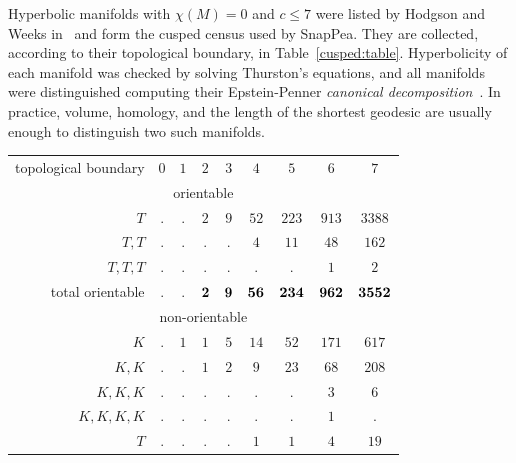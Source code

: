 \documentclass[10pt]{article}      %
\begin{document}
Hyperbolic manifolds with $\chi(M)=0$ and $c\leqslant 7$ were listed 
by Hodgson and Weeks in~\cite{CaHiWe}
and form the cusped census used by SnapPea. They are collected, according to their
topological boundary, in Table~\ref{cusped:table}.
Hyperbolicity of each manifold was checked by
solving Thurston's equations, and all manifolds were distinguished computing their
Epstein-Penner \emph{canonical decomposition}~\cite{EpPe}. In practice,
volume, homology, and 
the length of the shortest geodesic are usually enough to distinguish two such manifolds.



\begin{table}
  \begin{center}
    \begin{tabular}{rcccccccc}
      topological boundary & $0$ & $1$ & $2$ & $3$ & $4$ & $5$ & $6$ & $7$ \\
      
      \multicolumn{9}{c}{orientable\phantom{\Big|}} \\


      $T$ & . & . & $2$ & $9$ & $52$ & $223$ & $913$ & $3388$ \\
      
      $T,T$ & . & . & .   & .   & $4$  & $11$  & $48$  & $162$ \\
      
      $T,T,T$ & . & . & .   & .   & .    & .     & $1$   & $2$ \\
      
      
      total orientable & . & . & $\bf 2$ & $\bf 9$ & $\bf{56}$ & $\bf{234}$ & $\bf{962}$ & $\bf{3552}$ \\
      
      \multicolumn{9}{c}{non-orientable\phantom{\Big|}} \\

      $K$ & . & $1$ & $1$ & $5$ & $14$ & $52$ & $171$ & $617$ \\
      
      $K,K$ & . & .   & $1$ & $2$ & $9$  & $23$ & $68$  & $208$ \\
      
      $K,K,K$ & . & .   & .   & .   & .    & .    & $3$   & $6$   \\
      
      $K,K,K,K$ & . & .   & .   & .   & .    & .    & $1$   & .     \\
      
      $T$ & . & .   & .   & .   & $1$  & $1$  & $4$   & $19$  \\
      

\end{tabular}
\end{center}
\end{table}
\end{document}
